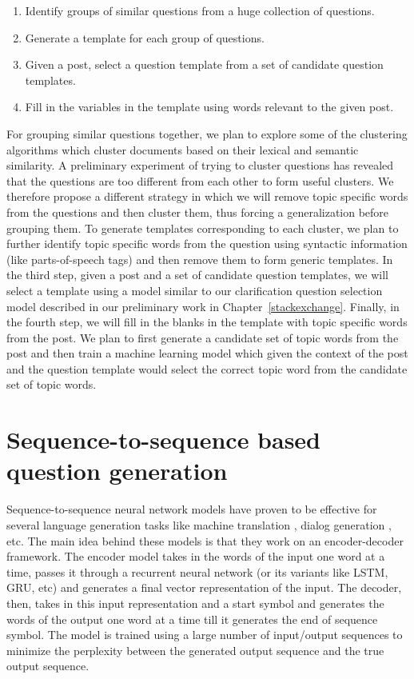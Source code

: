 \documentclass[11pt]{report}
\renewcommand\cite{\citep}	%
\begin{document}
\begin{enumerate}
\item Identify groups of similar questions from a huge collection of questions.
\item Generate a template for each group of questions.
\item Given a post, select a question template from a set of candidate question templates.
\item Fill in the variables in the template using words relevant to the given post.
\end{enumerate}

\noindent
For grouping similar questions together, we plan to explore some of the clustering algorithms which cluster documents based on their lexical and semantic similarity. A preliminary experiment of trying to cluster questions has revealed that the questions are too different from each other to form useful clusters. We therefore propose a different strategy in which we will remove topic specific words from the questions and then cluster them, thus forcing a generalization before grouping them. To generate templates corresponding to each cluster, we plan to further identify topic specific words from the question using syntactic information (like parts-of-speech tags) and then remove them to form generic templates. In the third step, given a post and a set of candidate question templates, we will select a template using a model similar to our clarification question selection model described in our preliminary work in Chapter~\ref{stackexchange}. Finally, in the fourth step, we will fill in the blanks in the template with topic specific words from the post. We plan to first generate a candidate set of topic words from the post and then train a machine learning model which given the context of the post and the question template would select the correct topic word from the candidate set of topic words.
 
\newpage
\section{Sequence-to-sequence based question generation}

Sequence-to-sequence neural network models have proven to be effective for several language generation tasks like machine translation \cite{sutskever2014sequence}, dialog generation \cite{serban2015building}, etc. The main idea behind these models is that they work on an encoder-decoder framework. The encoder model takes in the words of the input one word at a time, passes it through a recurrent neural network (or its variants like LSTM, GRU, etc) and generates a final vector representation of the input. The decoder, then, takes in this input representation and a start symbol and generates the words of the output one word at a time till it generates the end of sequence symbol. The model is trained using a large number of input/output sequences to minimize the perplexity between the generated output sequence and the true output sequence.\\
\end{document}
